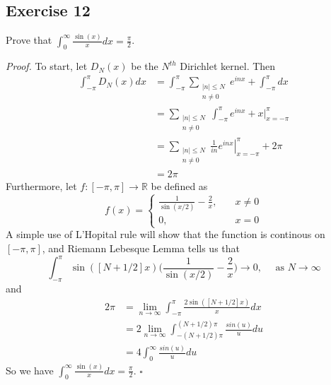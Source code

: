 \documentclass[12pt]{article}
\newenvironment{proof}{\textit{Proof.}}{\hfill$\square$}
\newcommand*\Eval[3]{\left.#1\right\rvert_{#2}^{#3}}
\newcommand{\bbr}{\mathbb{R}}
\begin{document}
\subsection*{Exercise 12}
Prove that $\displaystyle\int_{0}^{\infty}\frac{\sin(x)}{x}dx=\frac{\pi}{2}$.

\vspace{2em}
\begin{proof}
    To start, let $D_N(x)$ be the $N^{th}$ Dirichlet kernel.
    Then
    \begin{align*}
        \int_{-\pi}^{\pi}D_N(x)dx&=\int_{-\pi}^{\pi}\sum_{\substack{|n|\le N\\n\ne0}}e^{inx}+\int_{-\pi}^{\pi}dx\\
        &=\sum_{\substack{|n|\le N\\n\ne0}}\int_{-\pi}^{\pi}e^{inx}+\Eval{x}{x=-\pi}{\pi}\\
        &=\sum_{\substack{|n|\le N\\n\ne0}}\frac{1}{in}\Eval{e^{inx}}{x=-\pi}{\pi}+2\pi\\
        &=2\pi
    \end{align*}
    Furthermore, let $f:[-\pi,\pi]\to\bbr$ be defined as 
    \begin{equation*}
        f(x)=\begin{cases}
            \frac{1}{\sin(x/2)}-\frac{2}{x},&\hspace{1em}x\ne0\\
            0, &\hspace{1em}x=0
        \end{cases}
    \end{equation*}
    A simple use of L'Hopital rule will show that the function is continous on $[-\pi,\pi]$, and Riemann Lebesque Lemma tells us that
    \begin{equation*}
        \int_{-\pi}^{\pi}\sin([N+1/2]x)\Big(\frac{1}{\sin(x/2)}-\frac{2}{x}\Big)\to0,\hspace{1em}\text{ as }N\to\infty
    \end{equation*}
    and
    \begin{align*}
        2\pi&=\lim_{n\to\infty}\int_{-\pi}^{\pi}\frac{2\sin([N+1/2]x)}{x}dx\\
        &=2\lim_{n\to\infty}\int_{-(N+1/2)\pi}^{(N+1/2)\pi}\frac{sin(u)}{u}du\\
        &=4\int_{0}^{\infty}\frac{sin(u)}{u}du
    \end{align*}
    So we have $\displaystyle\int_{0}^{\infty}\frac{\sin(x)}{x}dx=\frac{\pi}{2}$.
\end{proof}
\newpage
\end{document}
